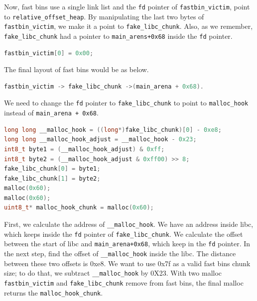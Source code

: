 \documentclass{masterthesis}
\newcommand*\fb{fast bins}
\begin{document}
Now,  \fb{} use a single link list and the \lstinline{fd} pointer of \lstinline{fastbin_victim}, point to \lstinline{relative_offset_heap}. By manipulating the last two bytes of \lstinline{fastbin_victim}, we make it a point to \lstinline{fake_libc_chunk}. Also, as we remember, \lstinline{fake_libc_chunk} had a pointer to \lstinline{main_arens+0x68} inside the \lstinline{fd} pointer.

\begin{lstlisting}[language=c,frame=tlrb]
fastbin_victim[0] = 0x00;
\end{lstlisting}

The final layout of \fb{} would be as below.

\begin{lstlisting}[language=c,frame=tlrb]
fastbin_victim -> fake_libc_chunk ->(main_arena + 0x68).
\end{lstlisting}

We need to change the \lstinline{fd} pointer to \lstinline{fake_libc_chunk} to point to \lstinline{malloc_hook} instead of \lstinline{main_arena + 0x68}.

\begin{lstlisting}[language=c,frame=tlrb]
long long __malloc_hook = ((long*)fake_libc_chunk)[0] - 0xe8;
long long __malloc_hook_adjust = __malloc_hook - 0x23;
int8_t byte1 = (__malloc_hook_adjust) & 0xff; 
int8_t byte2 = (__malloc_hook_adjust & 0xff00) >> 8; 
fake_libc_chunk[0] = byte1;
fake_libc_chunk[1] = byte2;
malloc(0x60);
malloc(0x60);
uint8_t* malloc_hook_chunk = malloc(0x60);
\end{lstlisting}

First, we calculate the address of \lstinline{__malloc_hook}. We have an address inside libc, which keeps inside the \lstinline{fd} pointer of \lstinline{fake_libc_chunk}. We calculate the offset between the start of libc and \lstinline{main_arena+0x68}, which keep in the \lstinline{fd} pointer. In the next step, find the offset of \lstinline{__malloc_hook} inside the libc. The distance between these two offsets is 0xe8.
We want to use  0x7f as a valid \fb{} chunk size; to do that, we subtract \lstinline{__malloc_hook} by 0X23. With two malloc \lstinline{fastbin_victim} and \lstinline{fake_libc_chunk} remove from \fb{}, the final malloc returns the \lstinline{malloc_hook_chunk}.
\end{document}
